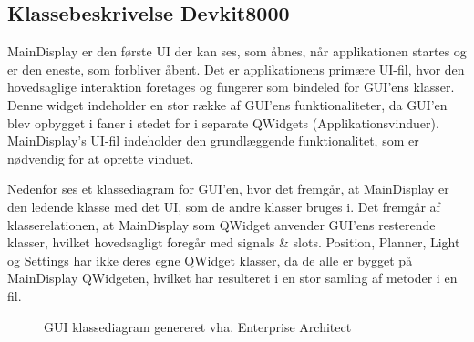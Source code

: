 \subsection{Klassebeskrivelse Devkit8000}

MainDisplay er den første UI der kan ses, som åbnes, når applikationen startes og er den eneste, som forbliver åbent. Det er applikationens primære UI-fil, hvor den hovedsaglige interaktion foretages og fungerer som bindeled for GUI'ens klasser. Denne widget indeholder en stor række af GUI'ens funktionaliteter, da GUI'en blev opbygget i faner i stedet for i separate QWidgets (Applikationsvinduer). MainDisplay's UI-fil indeholder den grundlæggende funktionalitet, som er nødvendig for at oprette vinduet.
\newline

Nedenfor ses et klassediagram for GUI’en, hvor det fremgår, at MainDisplay er den ledende klasse med det UI, som de andre klasser bruges i. Det fremgår af klasserelationen, at MainDisplay som QWidget anvender GUI’ens resterende klasser, hvilket hovedsagligt foregår med signals \& slots. Position, Planner, Light og Settings har ikke deres egne QWidget klasser, da de alle er bygget på MainDisplay QWidgeten, hvilket har resulteret i en stor samling af metoder i en fil.

\begin{figure}[H] \centering
    \caption{GUI klassediagram genereret vha. Enterprise Architect}
    \label{fig:GUI klassediagram}
\end{figure}

